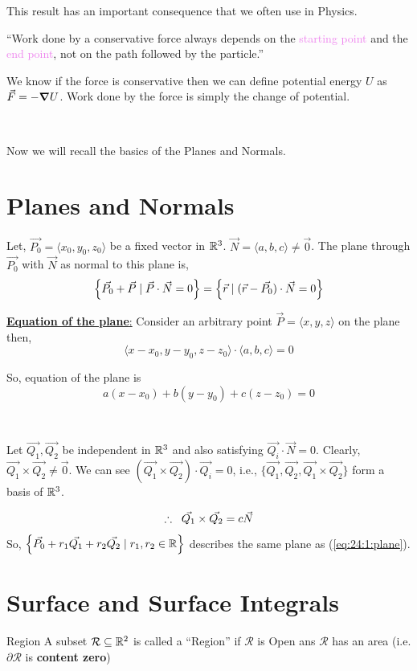 \documentclass[../Analysis-3.tex]{subfiles}
\begin{document}
This result has an important consequence that we often use in Physics.

``Work done by a conservative force always depends on the \textcolor{violet}{starting point} and the \textcolor{violet}{end point}, not on the path followed by the particle.''
\

We know if the force is conservative then we can define potential energy $U$ as $ \vec{F} = -\grad U$. Work done by the force is simply the change of potential.

\

Now we will recall the basics of the Planes and Normals.


\section{Planes and Normals}
Let, $\vec{P_0} = \langle x_0,y_0,z_0 \rangle$ be a fixed vector in $\mathbb{R}^3$. $\vec{N} = \langle a,b,c \rangle \neq \vec{0}$. The plane through $\vec{P_0}$ with $\vec{N}$ as normal to this plane is,
\[ \qty{\vec{P_0} + \vec{P} \mid \vec{P}\cdot \vec{N} = 0} = \qty{\vec{r} \mid (\vec{r}-\vec{P_0})\cdot \vec{N} = 0 } \]

\underline{\textbf{Equation of the plane}:} Consider an arbitrary point $\vec{P} = \langle x,y,z\rangle$ on the plane then, $$\langle x-x_0,y-y_0,z-z_0\rangle \cdot \langle a,b,c \rangle = 0$$

So, equation of the plane is
\begin{equation}
  a(x-x_0)+b(y-y_0) +c(z-z_0)= 0 \label{eq:24:1:plane}
\end{equation}

\

Let $\vec{Q_1},\vec{Q_2}$ be independent in $\mathbb{R}^3$ and also satisfying $\vec{Q_i} \cdot \vec{N} = 0$. Clearly, $\vec{Q_1}\times \vec{Q_2} \neq \vec{0}$. We can see $(\vec{Q_1}\times \vec{Q_2}) \cdot \vec{Q_i} = 0$, i.e., $\{\vec{Q_1},\vec{Q_2},\vec{Q_1}\times \vec{Q_2}\}$ form a basis of $\mathbb{R}^3$.

$$\therefore \hspace{0.2cm}\vec{Q_1}\times \vec{Q_2} = c \vec{N}$$
So, $\qty{\vec{P_0} + r_1 \vec{Q_1} + r_2 \vec{Q_2} \mid r_1,r_2 \in \mathbb{R}}$ describes the same plane as (\ref{eq:24:1:plane}).

\section{Surface and Surface Integrals}

\begin{Def}{Region}{}
  A subset $\mathcal{R} \subseteq \mathbb{R}^2$ is called a \enquote{Region} if $\mathcal{R}$ is Open ans $\mathcal{R}$ has an area (i.e. $\partial \mathcal{R}$ is \textbf{content zero})
\end{Def}
\end{document}
